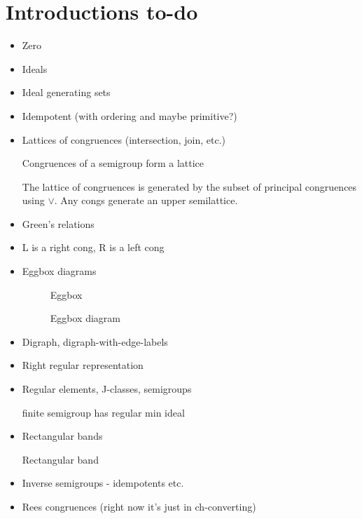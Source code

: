 \section{Introductions to-do}
\begin{itemize}
\item Zero
\item Ideals
\item Ideal generating sets \begin{definition}\label{def:ideal-generating-set}\end{definition}
\item Idempotent (with ordering and maybe primitive?)
\item Lattices of congruences (intersection, join, etc.)
  \begin{theorem}\label{thm:congruence-lattice}Congruences of a semigroup form a lattice\end{theorem}
  \begin{proposition}\label{prop:congruence-lattice-gens}The lattice of congruences is generated by the subset of principal congruences using $\vee$.  Any congs generate an upper semilattice.\end{proposition}
\item Green's relations
\item L is a right cong, R is a left cong
\item Eggbox diagrams \begin{figure}[h]Eggbox\caption{Eggbox diagram}\label{fig:eggbox-diagram}\end{figure}
\item Digraph, digraph-with-edge-labels
\item Right regular representation
\item Regular elements, J-classes, semigroups
  \begin{theorem}\label{thm:regular-min-ideal}finite semigroup has regular min ideal\end{theorem}
\item Rectangular bands
  \begin{definition}\label{def:rectangular-band}Rectangular band\end{definition}
\item Inverse semigroups - idempotents etc.
\item Rees congruences (right now it's just in ch-converting)
\end{itemize}
